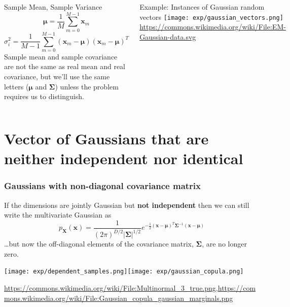 \documentclass{beamer}
\begin{document}
\begin{frame}
  \begin{columns}
    \column{2.25in}
    \begin{block}{Sample Mean, Sample Variance}
      \[
      \bm{\mu}=\frac{1}{M}\sum_{m=0}^{M-1}\mathbf{x}_m
      \]
      \[
      \sigma_i^2=\frac{1}{M-1}\sum_{m=0}^{M-1}(\mathbf{x}_m-\bm{\mu})(\mathbf{x}_m-\bm{\mu})^T
      \]
      Sample mean and sample covariance are not the same as real mean
      and real covariance, but we'll use the same letters ($\bm{\mu}$
      and $\bm{\Sigma}$) unless the problem requires us to distinguish.
    \end{block}
    \column{2in}
    \begin{block}{Example: Instances of Gaussian random vectors}
      \texttt{[image: exp/gaussian\_vectors.png]}
      {\footnotesize\url{https://commons.wikimedia.org/wiki/File:EM-Gaussian-data.svg}}
    \end{block}
  \end{columns}
\end{frame}

\section[Non-Diagonal Covariance]{Vector of Gaussians that are neither independent nor identical}
\setcounter{subsection}{1}

\begin{frame}
  \frametitle{Gaussians with non-diagonal covariance matrix}
  If the dimensions are jointly Gaussian but {\bf not independent} then we
  can still write the multivariate Gaussian as
  \[
  p_{\mathbf{X}}(\mathbf{x})=\frac{1}{(2\pi)^{D/2}|\bm{\Sigma}|^{1/2}}e^{-\frac{1}{2}
    (\mathbf{x}-\bm{\mu})^T\bm{\Sigma}^{-1}(\mathbf{x}-\bm{\mu})}
  \]
  \ldots but now the off-diagonal elements of the
  covariance matrix, $\bm{\Sigma}$, are no longer zero.
  
  \centerline{\texttt{[image: exp/dependent\_samples.png]}\texttt{[image: exp/gaussian\_copula.png]}}
             {\footnotesize\url{https://commons.wikimedia.org/wiki/File:Multinormal_3_true.png},\url{https://commons.wikimedia.org/wiki/File:Gaussian_copula_gaussian_marginals.png}}

\end{frame}
\end{document}
